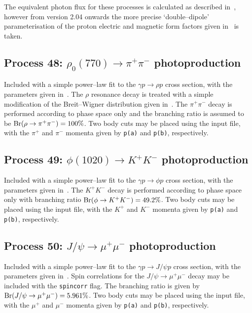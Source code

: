 \documentclass[12pt]{article}
\begin{document}
The equivalent photon flux for these processes is calculated as described in~\cite{Harland-Lang:2015cta}, however from version 2.04 onwards the 
more precise `double--dipole' parameterisation of the proton electric and magnetic form factors given in~\cite{Bernauer:2013tpr} is taken.

\subsection{Process 48: $\rho_0(770)\to \pi^+\pi^-$ photoproduction}

Included with a simple power--law fit to the $\gamma p\to \rho p$ cross section, with the parameters given in~\cite{Harland-Lang:2015cta}. 
The $\rho$ resonance decay is treated with a simple modification of the Breit--Wigner distribution given in~\cite{Leupold:1997dg}. The $\pi^+\pi^-$ 
decay is performed according to phase space only and the branching ratio is assumed to be ${\rm Br}(\rho \to \pi^+\pi^-)=100\%$. Two body cuts may be
 placed using the input file, with the $\pi^+$ and $\pi^-$  momenta given by \texttt{p(a)} and \texttt{p(b)}, respectively.

\subsection{Process 49: $\phi(1020)\to K^+K^-$ photoproduction}

Included with a simple power--law fit to the $\gamma p\to \phi p$ cross section, with the parameters given in~\cite{Harland-Lang:2015cta}. 
The $K^+K^-$ decay is performed according to phase space only with branching ratio ${\rm Br}(\phi \to K^+K^-)=49.2\%$. Two body cuts may be placed
 using the input file, with the $K^+$ and $K^-$  momenta given by \texttt{p(a)} and \texttt{p(b)}, respectively.


\subsection{Process 50: $J/\psi\to \mu^+\mu^-$ photoproduction}

Included with a simple power--law fit to the $\gamma p\to J/\psi p$ cross section, with the parameters given in~\cite{Harland-Lang:2015cta}. 
Spin correlations for the $J/\psi\to \mu^+\mu^-$ decay may be included with the \texttt{spincorr} flag. The branching ratio is given by 
${\rm Br}(J/\psi \to \mu^+\mu^-)=5.961\%$. Two body cuts may be placed using the input file, with the $\mu^+$ and $\mu^-$  momenta given by 
\texttt{p(a)} and \texttt{p(b)}, respectively.
\end{document}
